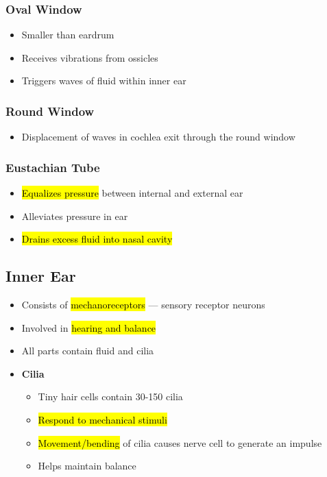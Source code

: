 \documentclass[a4paper,12pt]{article}
\begin{document}
\subsubsection{Oval Window}
\begin{itemize}
    \item{Smaller than eardrum}
    \item{Receives vibrations from ossicles}
    \item{Triggers waves of fluid within inner ear}
\end{itemize}

\subsubsection{Round Window}
\begin{itemize}
    \item{Displacement of waves in cochlea exit through the round window}
\end{itemize}

\subsubsection{Eustachian Tube}
\begin{itemize}
    \item{\hl{Equalizes pressure} between internal and external ear}
    \item{Alleviates pressure in ear}
    \item{\hl{Drains excess fluid into nasal cavity}}
\end{itemize}

\subsection{Inner Ear}
\begin{itemize}
    \item{Consists of \hl{mechanoreceptors} --- sensory receptor neurons}
    \item{Involved in \hl{hearing and balance}}
    \item{All parts contain fluid and cilia}
    \item{
            \textbf{Cilia}
            \begin{itemize}
                \item{Tiny hair cells contain 30-150 cilia}
                \item{\hl{Respond to mechanical stimuli}}
                \item{\hl{Movement/bending} of cilia causes nerve cell to generate an impulse}
                \item{Helps maintain balance}
            \end{itemize}
        }
\end{itemize}
\end{document}
